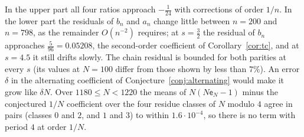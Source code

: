 In the upper part all four ratios approach $-\frac1{24}$ with corrections of order $1/n$. In the lower part the
residuals of $b_n$ and $a_n$ change little between $n=200$ and $n=798$, as the remainder $O(n^{-2})$ requires; at
$s=\frac32$ the residual of $b_n$ approaches $\frac5{96}=0.05208$, the second-order coefficient of
Corollary~\ref{cor:tc}, and at $s=4.5$ it still drifts slowly. The chain residual is bounded for both parities at every
$s$ (its values at $N=100$ differ from those shown by less than $7\%$). An error $\delta$ in the alternating coefficient
of Conjecture~\ref{conj:alternating} would make it grow like $\delta N$. Over $1180\le N<1220$ the means of
$N(N\mathsf e_N-1)$ minus the conjectured $1/N$ coefficient over the four residue classes of $N$ modulo $4$ agree in
pairs (classes $0$ and $2$, and $1$ and $3$) to within $1.6\cdot10^{-4}$, so there is no term with period $4$ at
order $1/N$.
